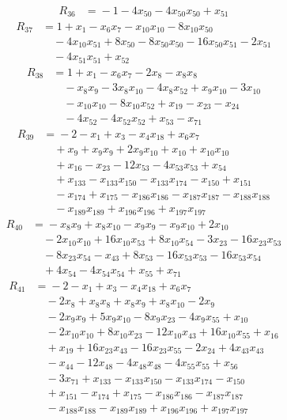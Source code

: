 \begin{align*}
R_{36}&={}-1 -4x_{50} -4x_{50}x_{50} +x_{51}
\end{align*}
\begin{align*}
R_{37}&={}1 +x_{1} -x_{6}x_{7} -x_{10}x_{10} -8x_{10}x_{50}\\
&\quad{}-4x_{10}x_{51} +8x_{50} -8x_{50}x_{50} -16x_{50}x_{51} -2x_{51}\\
&\quad{}-4x_{51}x_{51} +x_{52}
\end{align*}
\begin{align*}
R_{38}&={}1 +x_{1} -x_{6}x_{7} -2x_{8} -x_{8}x_{8}\\
&\quad{}-x_{8}x_{9} -3x_{8}x_{10} -4x_{8}x_{52} +x_{9}x_{10} -3x_{10}\\
&\quad{}-x_{10}x_{10} -8x_{10}x_{52} +x_{19} -x_{23} -x_{24}\\
&\quad{}-4x_{52} -4x_{52}x_{52} +x_{53} -x_{71}
\end{align*}
\begin{align*}
R_{39}&={}-2 -x_{1} +x_{3} -x_{4}x_{18} +x_{6}x_{7}\\
&\quad{}+x_{9} +x_{9}x_{9} +2x_{9}x_{10} +x_{10} +x_{10}x_{10}\\
&\quad{}+x_{16} -x_{23} -12x_{53} -4x_{53}x_{53} +x_{54}\\
&\quad{}+x_{133} -x_{133}x_{150} -x_{133}x_{174} -x_{150} +x_{151}\\
&\quad{}-x_{174} +x_{175} -x_{186}x_{186} -x_{187}x_{187} -x_{188}x_{188}\\
&\quad{}-x_{189}x_{189} +x_{196}x_{196} +x_{197}x_{197}
\end{align*}
\begin{align*}
R_{40}&={}-x_{8}x_{9} +x_{8}x_{10} -x_{9}x_{9} -x_{9}x_{10} +2x_{10}\\
&\quad{}-2x_{10}x_{10} +16x_{10}x_{53} +8x_{10}x_{54} -3x_{23} -16x_{23}x_{53}\\
&\quad{}-8x_{23}x_{54} -x_{43} +8x_{53} -16x_{53}x_{53} -16x_{53}x_{54}\\
&\quad{}+4x_{54} -4x_{54}x_{54} +x_{55} +x_{71}
\end{align*}
\begin{align*}
R_{41}&={}-2 -x_{1} +x_{3} -x_{4}x_{18} +x_{6}x_{7}\\
&\quad{}-2x_{8} +x_{8}x_{8} +x_{8}x_{9} +x_{8}x_{10} -2x_{9}\\
&\quad{}-2x_{9}x_{9} +5x_{9}x_{10} -8x_{9}x_{23} -4x_{9}x_{55} +x_{10}\\
&\quad{}-2x_{10}x_{10} +8x_{10}x_{23} -12x_{10}x_{43} +16x_{10}x_{55} +x_{16}\\
&\quad{}+x_{19} +16x_{23}x_{43} -16x_{23}x_{55} -2x_{24} +4x_{43}x_{43}\\
&\quad{}-x_{44} -12x_{48} -4x_{48}x_{48} -4x_{55}x_{55} +x_{56}\\
&\quad{}-3x_{71} +x_{133} -x_{133}x_{150} -x_{133}x_{174} -x_{150}\\
&\quad{}+x_{151} -x_{174} +x_{175} -x_{186}x_{186} -x_{187}x_{187}\\
&\quad{}-x_{188}x_{188} -x_{189}x_{189} +x_{196}x_{196} +x_{197}x_{197}
\end{align*}
